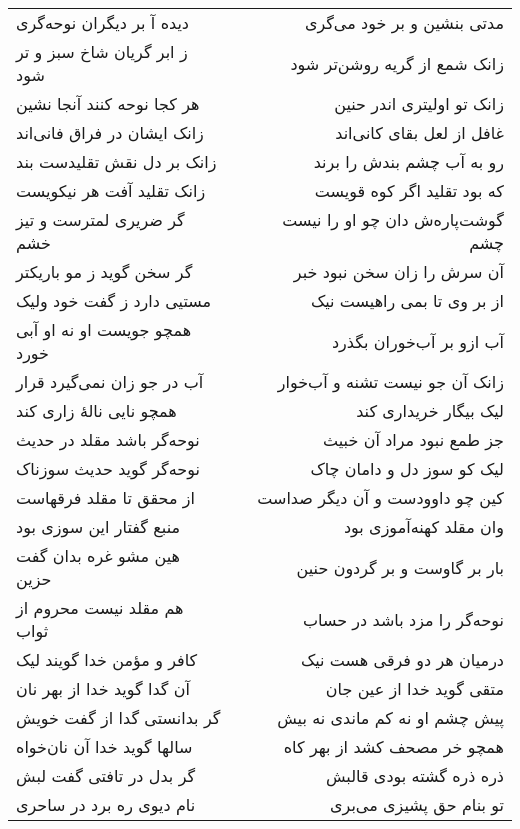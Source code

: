 \begin{center}
\begin{longtable}{l p{0.5cm} r}
دیده آ بر دیگران نوحه‌گری
&&
مدتی بنشین و بر خود می‌گری
\\
ز ابر گریان شاخ سبز و تر شود
&&
زانک شمع از گریه روشن‌تر شود
\\
هر کجا نوحه کنند آنجا نشین
&&
زانک تو اولیتری اندر حنین
\\
زانک ایشان در فراق فانی‌اند
&&
غافل از لعل بقای کانی‌اند
\\
زانک بر دل نقش تقلیدست بند
&&
رو به آب چشم بندش را برند
\\
زانک تقلید آفت هر نیکویست
&&
که بود تقلید اگر کوه قویست
\\
گر ضریری لمترست و تیز خشم
&&
گوشت‌پاره‌ش دان چو او را نیست چشم
\\
گر سخن گوید ز مو باریکتر
&&
آن سرش را زان سخن نبود خبر
\\
مستیی دارد ز گفت خود ولیک
&&
از بر وی تا بمی راهیست نیک
\\
همچو جویست او نه او آبی خورد
&&
آب ازو بر آب‌خوران بگذرد
\\
آب در جو زان نمی‌گیرد قرار
&&
زانک آن جو نیست تشنه و آب‌خوار
\\
همچو نایی نالهٔ زاری کند
&&
لیک بیگار خریداری کند
\\
نوحه‌گر باشد مقلد در حدیث
&&
جز طمع نبود مراد آن خبیث
\\
نوحه‌گر گوید حدیث سوزناک
&&
لیک کو سوز دل و دامان چاک
\\
از محقق تا مقلد فرقهاست
&&
کین چو داوودست و آن دیگر صداست
\\
منبع گفتار این سوزی بود
&&
وان مقلد کهنه‌آموزی بود
\\
هین مشو غره بدان گفت حزین
&&
بار بر گاوست و بر گردون حنین
\\
هم مقلد نیست محروم از ثواب
&&
نوحه‌گر را مزد باشد در حساب
\\
کافر و مؤمن خدا گویند لیک
&&
درمیان هر دو فرقی هست نیک
\\
آن گدا گوید خدا از بهر نان
&&
متقی گوید خدا از عین جان
\\
گر بدانستی گدا از گفت خویش
&&
پیش چشم او نه کم ماندی نه بیش
\\
سالها گوید خدا آن نان‌خواه
&&
همچو خر مصحف کشد از بهر کاه
\\
گر بدل در تافتی گفت لبش
&&
ذره ذره گشته بودی قالبش
\\
نام دیوی ره برد در ساحری
&&
تو بنام حق پشیزی می‌بری
\\
\end{longtable}
\end{center}
